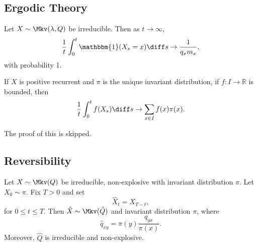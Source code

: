 \documentclass[12pt]{article}
\begin{document}
\subsection{Ergodic Theory}
\label{sub:ergodic_theory}

\begin{theorem}
	Let $X \sim \Mkv(\lambda, Q)$ be irreducible. Then as $t \to \infty$,
	\[
		\frac{1}{t} \int_{0}^{t} \mathbbm{1}(X_s = x) \diff s \to \frac{1}{q_x m_x}
	,\]
	with probability 1.

	If $X$ is positive recurrent and $\pi$ is the unique invariant distribution, if $f : I \to \mathbb{R}$ is bounded, then
	\[
	\frac{1}{t} \int_{0}^{t}f(X_s) \diff s \to \sum_{x \in I}f(x) \pi(x)
	.\]
\end{theorem}

The proof of this is skipped.

\subsection{Reversibility}
\label{sub:reversibility}

\begin{theorem}
	Let $X \sim \Mkv(Q)$ be irreducible, non-explosive with invariant distribution $\pi$. Let $X_0 \sim \pi$. Fix $T > 0$ and set
	\[
	\hat X_t = X_{T - t}
	,\]
	for $0 \leq t \leq T$. Then $\hat X \sim \Mkv(\hat Q)$ and invariant distribution $\pi$, where
	\[
	\hat q_{xy} = \pi(y) \frac{q_{yx}}{\pi(x)}
	.\]
	Moreover, $\hat Q$ is irreducible and non-explosive.
\end{theorem}
\end{document}
